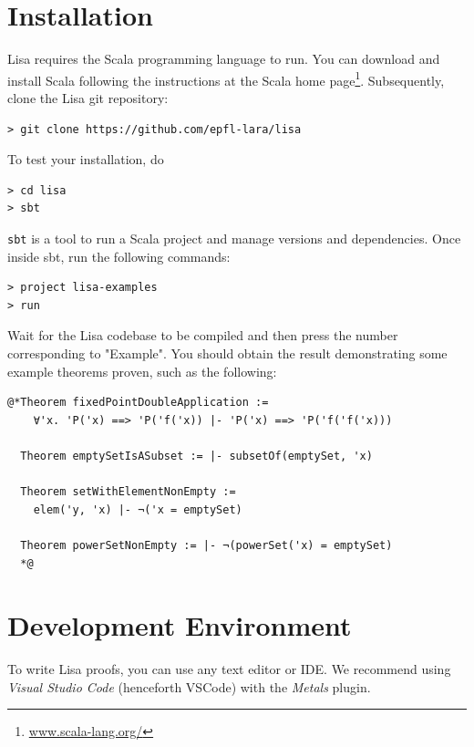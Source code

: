 \section{Installation}
Lisa requires the Scala programming language to run. You can download and install Scala following the instructions at the Scala home page\footnote{\url{www.scala-lang.org/}}. Subsequently, clone the Lisa git repository:
\begin{lstlisting}[language=console]
> git clone https://github.com/epfl-lara/lisa
\end{lstlisting}
To test your installation, do
\begin{lstlisting}[language=console]
> cd lisa
> sbt
\end{lstlisting}
\lstinline|sbt| is a tool to run a Scala project and manage versions and dependencies. Once inside sbt, run the following commands:
\begin{lstlisting}[language=console]
> project lisa-examples
> run
\end{lstlisting}
Wait for the Lisa codebase to be compiled and then press the number corresponding to "Example". You should obtain the result demonstrating some example theorems proven, such as the following:

\noindent
\begin{minipage}{\linewidth}\vspace{1em}
\begin{lstlisting}[language=console]
  @*Theorem fixedPointDoubleApplication :=
    ∀'x. 'P('x) ==> 'P('f('x)) |- 'P('x) ==> 'P('f('f('x)))

  Theorem emptySetIsASubset := |- subsetOf(emptySet, 'x)

  Theorem setWithElementNonEmpty :=
    elem('y, 'x) |- ¬('x = emptySet)

  Theorem powerSetNonEmpty := |- ¬(powerSet('x) = emptySet)
  *@
\end{lstlisting}
\end{minipage}

\section{Development Environment}
To write Lisa proofs, you can use any text editor or IDE. We recommend using \emph{Visual Studio Code} (henceforth VSCode) with the \emph{Metals} plugin.

